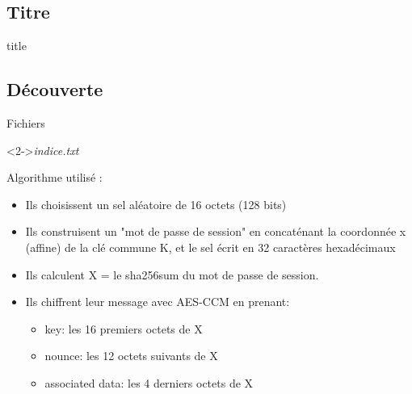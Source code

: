 \documentclass[10pt,sans,usenames,dvipsnames,french,compress]{beamer}
\begin{document}
\subsection{Titre}
\begin{frame}
	\begin{beamercolorbox}[sep=8pt,center]{title}
	\end{beamercolorbox}
\end{frame}


\subsection{Découverte}
\begin{frame}
	\begin{block}{Fichiers}
		\begin{small}
		\end{small}
	\end{block}

	\begin{block}<2->{\textit{indice.txt}}
		\begin{small}
      Algorithme utilisé :
      \begin{itemize}
        \item Ils choisissent un sel aléatoire de 16 octets (128 bits)
        \item Ils construisent un "mot de passe de session" en concaténant la coordonnée x (affine) de la clé commune K, et le sel écrit en 32 caractères hexadécimaux
        \item Ils calculent X = le sha256sum du mot de passe de session.
        \item Ils chiffrent leur message avec AES-CCM en prenant:
        \begin{itemize}
          \item key: les 16 premiers octets de X
          \item nounce: les 12 octets suivants de X
          \item associated data: les 4 derniers octets de X
        \end{itemize}
      \end{itemize}

		\end{small}
	\end{block}


\end{frame}
\end{document}
